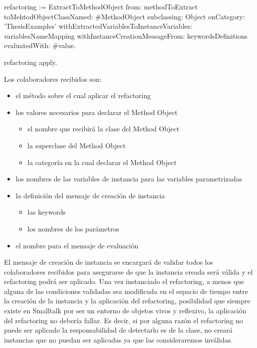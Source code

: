 \begin{code}
refactoring := ExtractToMethodObject from: methodToExtract
toMehtodObjectClassNamed: #MethodObject subclassing: Object onCategory:
'ThesisExamples' withExtractedVariablesToInstanceVariables: variablesNameMapping
withInstanceCreationMessageFrom: keywordsDefinitions evaluatedWith: #value.

refactoring apply.
\end{code}

Los colaboradores recibidos son:

\begin{itemize}
    \item el método sobre el cual aplicar el refactoring
    \item los valores necesarios para declarar el Method Object
    \begin{itemize}
        \item el nombre que recibirá la clase del Method Object
        \item la superclase del Method Object
        \item la categoría en la cual declarar el Method Object
    \end{itemize}
    \item los nombres de las variables de instancia para las variables
      parametrizadas
    \item la definición del mensaje de creación de instancia
    \begin{itemize}
        \item las keywords
        \item los nombres de los parámetros
    \end{itemize}
    \item el nombre para el mensaje de evaluación
\end{itemize}

El mensaje de creación de instancia se encargará de validar todos los
colaboradores recibidos para asegurarse de que la instancia creada será válida y
el refactoring podrá ser aplicado. Una vez instanciado el refactoring, a menos
que alguna de las condiciones validadas sea modificada en el espacio de tiempo
entre la creación de la instancia y la aplicación del refactoring, posibilidad
que siempre existe en Smalltalk por ser un entorno de objetos vivos y reflexivo,
la aplicación del refactoring no debería fallar. Es decir, si por alguna razón
el refactoring no puede ser aplicado la responsabilidad de detectarlo es de la
clase, no creará instancias que no puedan ser aplicadas ya que las
consideraremos inválidas.

